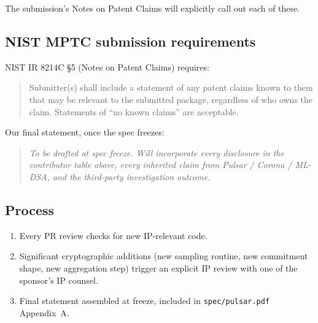The submission's Notes on Patent Claims will explicitly call out
each of these.

\subsection{NIST MPTC submission requirements}

NIST IR 8214C \S5 (Notes on Patent Claims) requires:

\begin{quote}
Submitter(s) shall include a statement of any patent claims known
to them that may be relevant to the submitted package, regardless
of who owns the claim. Statements of ``no known claims'' are
acceptable.
\end{quote}

Our final statement, once the spec freezes:

\begin{quote}
\emph{To be drafted at spec freeze. Will incorporate every
disclosure in the contributor table above, every inherited claim
from Pulsar / Corona / ML-DSA, and the third-party investigation
outcome.}
\end{quote}

\subsection{Process}

\begin{enumerate}[leftmargin=*, itemsep=0pt]
\item Every PR review checks for new IP-relevant code.
\item Significant cryptographic additions (new sampling routine, new
commitment shape, new aggregation step) trigger an explicit IP
review with one of the sponsor's IP counsel.
\item Final statement assembled at freeze, included in
\texttt{spec/pulsar.pdf} Appendix~A.
\end{enumerate}
